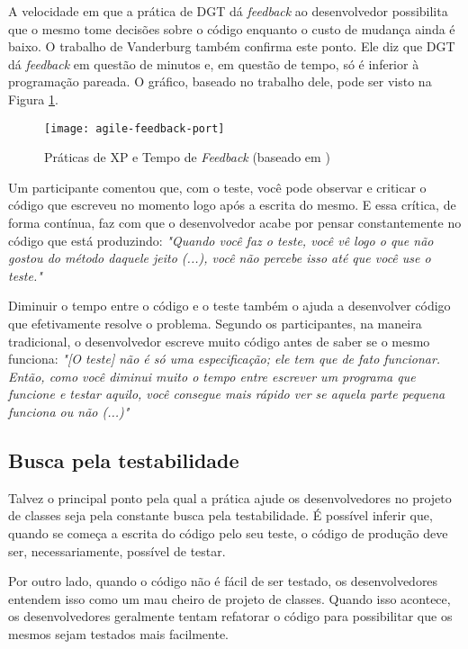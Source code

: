 A velocidade em que a prática de DGT dá \textit{feedback} ao desenvolvedor possibilita que o mesmo
tome decisões sobre o código enquanto o custo de mudança ainda é
baixo. O trabalho de Vanderburg \cite{vanderburg} também confirma este ponto.
Ele diz que DGT dá \textit{feedback} em questão de
minutos e, em questão de tempo, só é inferior à programação pareada. O gráfico,
baseado no trabalho dele, pode ser visto na Figura
\ref{fig:agile-feedback}.

\begin{figure}
  \centering
  \texttt{[image: agile-feedback-port]}
  \caption{Práticas de XP e Tempo de \textit{Feedback} (baseado em \cite{vanderburg})}
  \label{fig:agile-feedback}
\end{figure}

Um participante comentou que, com o teste, você pode observar
e criticar o código que escreveu no momento logo após a escrita do mesmo.
E essa crítica, de forma contínua, faz com que o desenvolvedor acabe
por pensar constantemente no código que está produzindo:
\textit{"Quando você faz o teste, você vê logo o que não gostou do método daquele jeito (...), você
não percebe isso até que você use o teste."}

Diminuir o tempo entre o código e o teste também o ajuda a desenvolver código
que efetivamente resolve o problema. Segundo os participantes, na maneira tradicional, 
o desenvolvedor escreve muito código antes de saber se o mesmo funciona:
\textit{"[O teste] não é só uma especificação; ele tem que de fato funcionar. Então,
como você diminui muito o tempo entre escrever um programa que funcione e testar aquilo,
você consegue mais rápido ver se aquela parte pequena funciona ou não (...)"}


\subsection{Busca pela testabilidade}

Talvez o principal ponto pela qual a prática ajude os desenvolvedores no projeto de classes 
seja pela constante busca pela testabilidade. É possível inferir que, quando se 
começa a escrita do código pelo seu teste, o código de produção deve ser, necessariamente,
possível de testar.

Por outro lado, quando o código não é fácil de ser testado, os desenvolvedores
entendem isso como um mau cheiro de projeto de classes. Quando isso acontece,
os desenvolvedores geralmente tentam refatorar o código para possibilitar que
os mesmos sejam testados mais facilmente.

